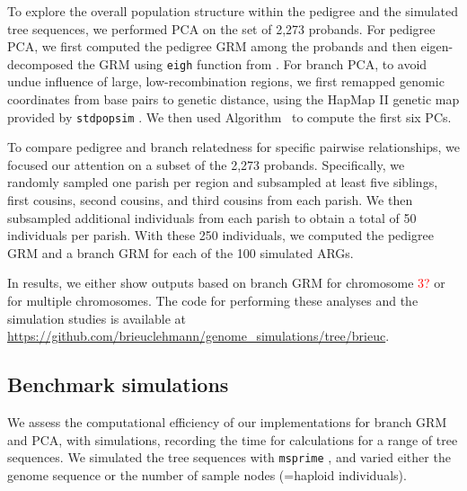 To explore the overall population structure within the pedigree and the simulated tree sequences,
we performed PCA on the set of 2,273 probands.
%
For pedigree PCA, we first computed the pedigree GRM
among the probands and then eigen-decomposed the GRM using
\texttt{eigh} function from \scipy{} \citep{Virtanen2020SciPy}.
%
For branch PCA, to avoid undue influence of large, low-recombination regions,
we first remapped genomic coordinates from base pairs to genetic distance,
using the HapMap II genetic map provided by \texttt{stdpopsim} \citep{adrion2020stdpopsim}.
%
We then used Algorithm~ to compute the first six PCs.

To compare pedigree and branch relatedness for specific pairwise relationships,
we focused our attention on a subset of the 2,273 probands.
%
Specifically, we randomly sampled one parish per region and
subsampled at least five siblings, first cousins, second cousins, and third cousins from each parish.
%
We then subsampled additional individuals from each parish
to obtain a total of 50 individuals per parish.
%
With these 250 individuals, we computed the pedigree GRM and a branch GRM
for each of the 100 simulated ARGs.

In results, we either show outputs based on branch GRM for chromosome \textcolor{red}{3?} or
for multiple chromosomes.
%
The code for performing these analyses and the simulation studies is available at
\url{https://github.com/brieuclehmann/genome_simulations/tree/brieuc}.



\subsection{Benchmark simulations}

We assess the computational efficiency of our implementations for branch GRM and PCA,
with simulations, recording the time for calculations for a range of tree sequences.
%
We simulated the tree sequences with \texttt{msprime} \citep{baumdicker2022efficient},
and varied either the genome sequence or the number of sample nodes (=haploid individuals).

